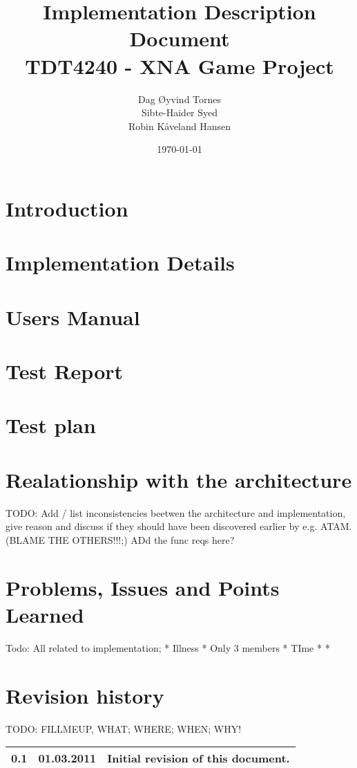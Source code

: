 \documentclass[titlepage,a4paper,11pt]{article}
\date{\today}
\begin{document}
\title{Implementation Description Document\\
 		TDT4240 - XNA Game Project}

\author{Dag Øyvind Tornes\\
 		Sibte-Haider Syed\\ 
		Robin Kåveland Hansen\\}
\maketitle

\pagestyle{empty}
\tableofcontents
\clearpage
\pagestyle{plain}

\section{Introduction}
	

\section{Implementation Details}
	
	
\section{Users Manual}
	
	
\section{Test Report}
	

\section{Test plan}
	
	
\section{Realationship with the architecture}
	TODO: Add / list inconsistencies beetwen the architecture and implementation, give reason and discuss if they should
	have been discovered earlier by e.g. ATAM. (BLAME THE OTHERS!!!;)
	ADd the func reqs here?
	
	
\section{Problems, Issues and Points Learned}
	Todo: All related to implementation; 
	* Illness
	* Only 3 members
	* TIme
	* 
	*


\section{Revision history}

TODO: FILLMEUP, WHAT; WHERE; WHEN; WHY!

\begin{table}[H]
  \begin{tabular}{| c | c | c |}
    \hline
    0.1 & 01.03.2011 & Initial revision of this document. \\
    \hline
  \end{tabular}
\end{table}
\end{document}
